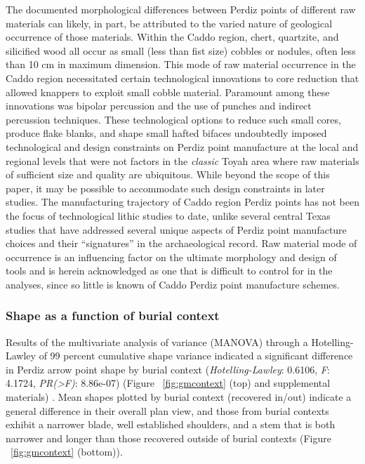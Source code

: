 \documentclass[review]{elsarticle}
\begin{document}
\newpage
The documented morphological differences between Perdiz points of different raw materials can likely, in part, be attributed to the varied nature of geological occurrence of those materials. Within the Caddo region, chert, quartzite, and silicified wood all occur as small (less than fist size) cobbles or nodules, often less than 10 cm in maximum dimension. This mode of raw material occurrence in the Caddo region necessitated certain technological innovations to core reduction that allowed knappers to exploit small cobble material. Paramount among these innovations was bipolar percussion and the use of punches and indirect percussion techniques. These technological options to reduce such small cores, produce flake blanks, and shape small hafted bifaces undoubtedly imposed technological and design constraints on Perdiz point manufacture at the local and regional levels that were not factors in the \textit{classic} Toyah area where raw materials of sufficient size and quality are ubiquitous. While beyond the scope of this paper, it may be possible to accommodate such design constraints in later studies. The manufacturing trajectory of Caddo region Perdiz points has not been the focus of technological lithic studies to date, unlike several central Texas studies that have addressed several unique aspects of Perdiz point manufacture choices and their “signatures” in the archaeological record. Raw material mode of occurrence is an influencing factor on the ultimate morphology and design of tools and is herein acknowledged as one that is difficult to control for in the analyses, since so little is known of Caddo Perdiz point manufacture schemes.

\subsubsection*{Shape as a function of burial context}

Results of the multivariate analysis of variance (MANOVA) through a Hotelling-Lawley of 99 percent cumulative shape variance indicated a significant difference in Perdiz arrow point shape by burial context (\textit{Hotelling-Lawley}: 0.6106, \textit{F}: 4.1724, \textit{PR(>F)}: 8.86e-07) (Figure ~\ref{fig:gmcontext} (top) and supplemental materials) \citep[Chapter 4]{RN8980}. Mean shapes plotted by burial context (recovered in/out) indicate a general difference in their overall plan view, and those from burial contexts exhibit a narrower blade, well established shoulders, and a stem that is both narrower and longer than those recovered outside of burial contexts (Figure ~\ref{fig:gmcontext} (bottom)).
\end{document}
